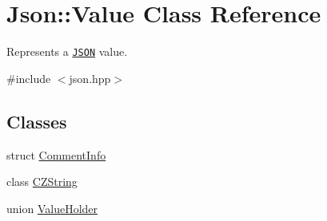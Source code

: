 \hypertarget{classJson_1_1Value}{}\section{Json\+:\+:Value Class Reference}
\label{classJson_1_1Value}


Represents a \href{http://www.json.org}{\tt J\+S\+ON} value.  




{\ttfamily \#include $<$json.\+hpp$>$}

\subsection*{Classes}
\begin{DoxyCompactItemize}
\item 
struct \hyperlink{structJson_1_1Value_1_1CommentInfo}{Comment\+Info}
\item 
class \hyperlink{classJson_1_1Value_1_1CZString}{C\+Z\+String}
\item 
union \hyperlink{unionJson_1_1Value_1_1ValueHolder}{Value\+Holder}
\end{DoxyCompactItemize}
